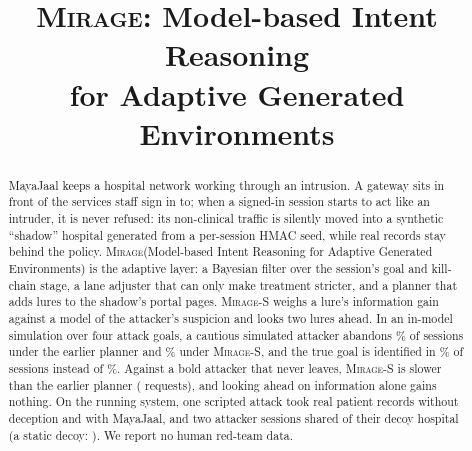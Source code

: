 \documentclass[conference,10pt]{IEEEtran}
\newcommand{\Mirage}{\textsc{Mirage}\xspace}
\begin{document}
\title{\Mirage: Model-based Intent Reasoning\\for Adaptive Generated Environments}
\author{}
\maketitle

\begin{abstract}
MayaJaal keeps a hospital network working through an intrusion. A gateway sits in front of the
services staff sign in to; when a signed-in session starts to act like an intruder, it is never
refused: its non-clinical traffic is silently moved into a synthetic
``shadow'' hospital generated from a per-session HMAC seed, while real records stay behind the
policy. \Mirage (Model-based Intent Reasoning for Adaptive Generated Environments) is the
adaptive layer: a Bayesian filter over the session's goal and kill-chain
stage, a lane adjuster that can only make treatment stricter, and a planner that adds lures to the
shadow's portal pages. \Mirage-S weighs a lure's information gain against a model of the
attacker's suspicion and looks two lures ahead. In an in-model simulation over four
attack goals, a cautious simulated attacker abandons \RMCautIgOneLeft\% of sessions under the
earlier planner and \RMCautStealthLeft\% under \Mirage-S, and the true goal is identified in
\RMCautStealthIdent\% of sessions instead of \RMCautIgOneIdent\%. Against a bold attacker that
never leaves, \Mirage-S is slower than the earlier planner (\DMBoldStealthSteps{} requests), and
looking ahead on information alone gains nothing. On the running system, one scripted attack took
\ERBaseReal{} real patient records without deception and \ERMjReal{} with MayaJaal, and two
attacker sessions shared \ERMjOverlap{} of their decoy hospital (a static decoy: \ERStaticOverlap).
We report no human red-team data.
\end{abstract}
\end{document}
